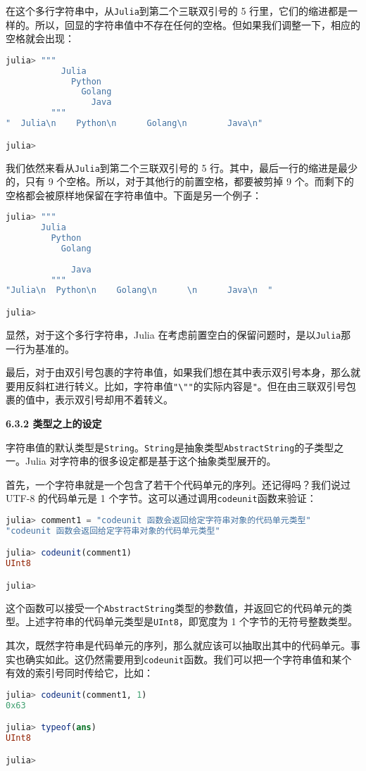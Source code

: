 在这个多行字符串中，从\verb|Julia|到第二个三联双引号的 5 行里，它们的缩进都是一样的。所以，回显的字符串值中不存在任何的空格。但如果我们调整一下，相应的空格就会出现：
\begin{lstlisting}[language=julia]
julia> """
           Julia
             Python
               Golang
                 Java
         """
"  Julia\n    Python\n      Golang\n        Java\n"

julia> 
\end{lstlisting}

我们依然来看从\verb|Julia|到第二个三联双引号的 5 行。其中，最后一行的缩进是最少的，只有 9 个空格。所以，对于其他行的前置空格，都要被剪掉 9 个。而剩下的空格都会被原样地保留在字符串值中。下面是另一个例子：
\begin{lstlisting}[language=julia]
julia> """
       Julia
         Python
           Golang
             
             Java
         """
"Julia\n  Python\n    Golang\n      \n      Java\n  "

julia> 
\end{lstlisting}

显然，对于这个多行字符串，Julia 在考虑前置空白的保留问题时，是以\verb|Julia|那一行为基准的。

最后，对于由双引号包裹的字符串值，如果我们想在其中表示双引号本身，那么就要用反斜杠进行转义。比如，字符串值\verb|"\""|的实际内容是\verb|"|。但在由三联双引号包裹的值中，表示双引号却用不着转义。

\textbf{6.3.2 类型之上的设定}

字符串值的默认类型是\verb|String|。\verb|String|是抽象类型\verb|AbstractString|的子类型之一。Julia 对字符串的很多设定都是基于这个抽象类型展开的。

首先，一个字符串就是一个包含了若干个代码单元的序列。还记得吗？我们说过 UTF-8 的代码单元是 1 个字节。这可以通过调用\verb|codeunit|函数来验证：
\begin{lstlisting}[language=julia]
julia> comment1 = "codeunit 函数会返回给定字符串对象的代码单元类型"
"codeunit 函数会返回给定字符串对象的代码单元类型"

julia> codeunit(comment1)
UInt8

julia> 
\end{lstlisting}

这个函数可以接受一个\verb|AbstractString|类型的参数值，并返回它的代码单元的类型。上述字符串的代码单元类型是\verb|UInt8|，即宽度为 1 个字节的无符号整数类型。

其次，既然字符串是代码单元的序列，那么就应该可以抽取出其中的代码单元。事实也确实如此。这仍然需要用到\verb|codeunit|函数。我们可以把一个字符串值和某个有效的索引号同时传给它，比如：
\begin{lstlisting}[language=julia]
julia> codeunit(comment1, 1)
0x63

julia> typeof(ans)
UInt8

julia> 
\end{lstlisting}

